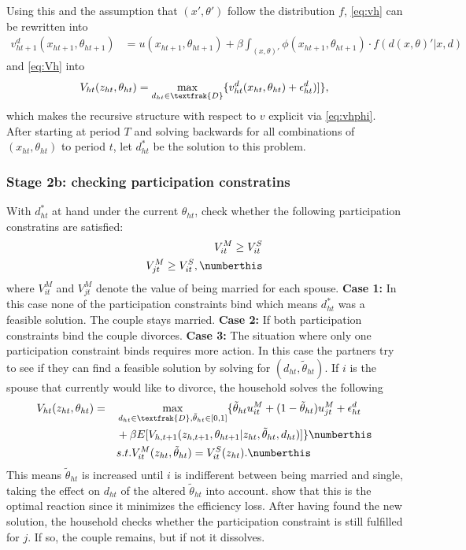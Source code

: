 Using this and the assumption that $(x',\theta')$ follow the distribution $f$, \eqref{eq:vh} can be rewritten into
\begin{align}
v_{ht+1}^d(x_{ht+1},\theta_{ht+1})&=u(x_{ht+1},\theta_{ht+1}) +\beta \int_{(x,\theta)'}{\phi(x_{ht+1},\theta_{ht+1})\cdot f(d(x,\theta)'|x,d)}  
\label{eq:vhphi}
\end{align}
and \eqref{eq:Vh} into
\begin{align}
V_{ht}(z_{ht},\theta_{ht})=\max_{d_{ht}\in \textfrak{D}} \{v_{ht}^d(x_{ht},\theta_{ht})+\epsilon_{ht}^d)]\},
\label{eq:Vhphi}
\end{align}
which makes the recursive structure with respect to $v$ explicit via \eqref{eq:vhphi}. After starting at period $T$ and solving backwards for all combinations of $(x_{ht},\theta_{ht})$ to period $t$, let $d_{ht}^*$ be the solution to this problem. 

\subsubsection{Stage 2b: checking participation constratins} \label{sec:2b}
With $d_{ht}^*$ at hand under the current $\theta_{ht}$, check whether the following participation constratins are satisfied:
\begin{align*}
V_{it}^M \geq V_{it}^S \\
V_{jt}^M \geq V_{it}^S, \numberthis
\label{eq:pc}
\end{align*}
where $V_{it}^M$ and $V_{jt}^M$ denote the value of being married for each spouse.
\textbf{Case 1:} In this case none of the participation constraints bind which means $d_{ht}^*$ was a feasible solution. The couple stays married.
\textbf{Case 2:} If both participation constraints bind the couple divorces.
\textbf{Case 3:} The situation where only one participation constraint binds requires more action. In this case the partners try to see if they can find a feasible solution by solving for $(d_{ht},\tilde{\theta}_{ht})$. If $i$ is the spouse that currently would like to divorce, the household solves the following 
\begin{alignat*}{3}
&V_{ht}(z_{ht},\theta_{ht})=&&\max_{d_{ht}\in \textfrak{D},\tilde{\theta}_{ht}\in[0,1]} \{\tilde{\theta}_{ht} u_{it}^M+(1-\tilde{\theta}_{ht})u_{jt}^M+\epsilon_{ht}^d \\
& &&+\beta E[V_{h,t+1}(z_{h,t+1},\theta_{ht+1}|z_{ht},\tilde{\theta}_{ht},d_{ht})]\} \numberthis \\
& && s.t. V_{it}^M(z_{ht},\tilde{\theta}_{ht})=V_{it}^S(z_{ht}). \numberthis
\label{eq:Vhtilde}
\end{alignat*}
This means $\tilde{\theta}_{ht}$ is increased until $i$ is indifferent between being married and single, taking the effect on $d_{ht}$ of the altered $\tilde{\theta}_{ht}$ into account. \cite{Ligonetal2002} show that this is the optimal reaction since it minimizes the efficiency loss. After having found the new solution, the household checks whether the participation constraint is still fulfilled for $j$. If so, the couple remains, but if not it dissolves. 

